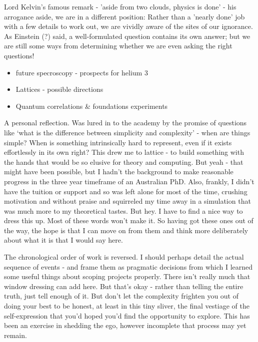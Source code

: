 Lord Kelvin's famous remark - 'aside from two clouds, physics is done' - his arrogance aside, we are in a different position: Rather than a 'nearly done' job with a few details to work out, we are vividly aware of the sites of our ignorance. As Einstein (?) said, a well-formulated question contains its own answer; but we are still some ways from determining whether we are even asking the right questions!

\begin{itemize}
\item
  future specroscopy - prospects for helium 3
\item
  Lattices - possible directions
\item
  Quantum correlations \& foundations experiments
\end{itemize}


A personal reflection. Was lured in to the academy by the promise of
questions like `what is the difference between simplicity and
complexity' - when are things simple? When is something intrinsically
hard to represent, even if it exists effortlessly in its own right? This
drew me to lattice - to build something with the hands that would be so
elusive for theory and computing. But yeah - that might have been
possible, but I hadn't the background to make reasonable progress in the
three year timeframe of an Australian PhD. Also, frankly, I didn't have
the tuition or support and so was left alone for most of the time,
crushing motivation and without praise and squirreled my time away in a
simulation that was much more to my theoretical tastes. But hey. I have
to find a nice way to dress this up. Most of these words won't make it.
So having got these ones out of the way, the hope is that I can move on
from them and think more deliberately about what it is that I would say
here.

The chronological order of work is reversed. I should perhaps detail the
actual sequence of events - and frame them as pragmatic decisions from
which I learned some useful things about scoping projects properly.
There isn't really much that window dressing can add here. But that's
okay - rather than telling the entire truth, just tell enough of it. But
don't let the complexity frighten you out of doing your best to be
honest, at least in this tiny sliver, the final vestiage of the
self-expression that you'd hoped you'd find the opportunity to explore.
This has been an exercise in shedding the ego, however incomplete that
process may yet remain.

